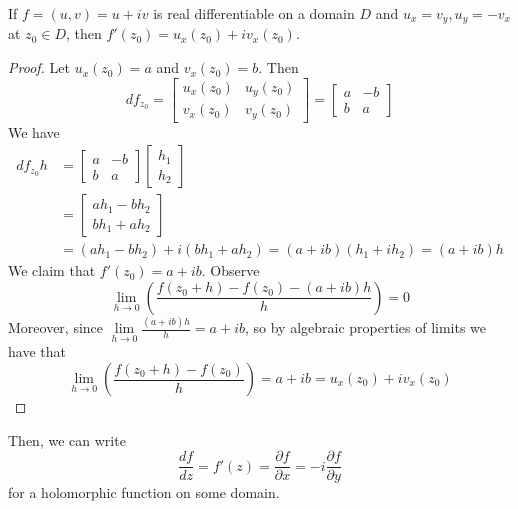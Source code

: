 \documentclass[12pt, a4paper, oneside, openright, titlepage]{book}
\begin{document}
\begin{thm}
    If $f = (u,v) = u+iv$ is real differentiable on a domain $D$ and $u_x = v_y, u_y = -v_x$ at $z_0 \in D$, then $f'(z_0) = u_x(z_0) + iv_x(z_0)$.
\end{thm}
\begin{proof}
    Let $u_x(z_0) = a$ and $v_x(z_0) = b$. Then $$df_{z_0} = \begin{bmatrix} u_x(z_0) & u_y(z_0) \\ v_x(z_0) & v_y(z_0) \end{bmatrix} = \begin{bmatrix} a & -b \\ b & a \end{bmatrix}$$
    We have \begin{align*}
        df_{z_0}h &= \begin{bmatrix} a & -b \\ b & a \end{bmatrix}\begin{bmatrix} h_1 \\ h_2\end{bmatrix} \\
            &= \begin{bmatrix} ah_1-bh_2 \\ bh_1+ah_2 \end{bmatrix} \\
                &= (ah_1-bh_2) +i(bh_1+ah_2) = (a+ib)(h_1+ih_2) = (a+ib)h
    \end{align*}
    We claim that $f'(z_0) = a+ib$. Observe \begin{equation*}
        \lim\limits_{h\rightarrow 0} \left(\frac{f(z_0+h) - f(z_0) - (a+ib)h}{h}\right) = 0
    \end{equation*}
    Moreover, since $\lim\limits_{h\rightarrow 0}\frac{(a+ib)h}{h} = a+ib$, so by algebraic properties of limits we have that \begin{equation*}
        \lim\limits_{h\rightarrow 0} \left(\frac{f(z_0+h) - f(z_0)}{h}\right) = a+ib = u_x(z_0)+iv_x(z_0)
    \end{equation*}
\end{proof}

Then, we can write \begin{equation*}
    \boxed{\frac{df}{dz} = f'(z) = \frac{\partial f}{\partial x} = -i\frac{\partial f}{\partial y}}
\end{equation*}
for a holomorphic function on some domain.
\end{document}
